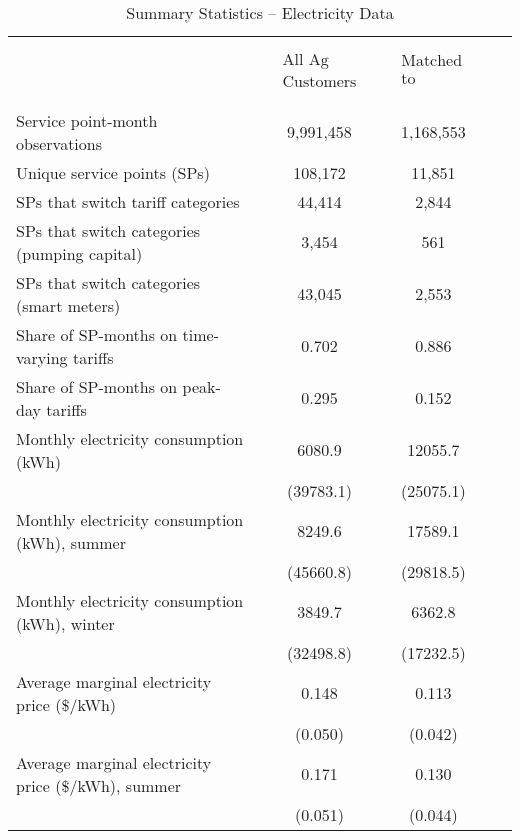 \begin{table}\centering
\caption{\normalsize Summary Statistics -- Electricity Data}
\label{tab:elec_summary_stats}
\begin{tabular}{lrcrcrr}
\hline
\hline
\\ 
\vspace{-8mm}
\\
&& $\begin{matrix}\text{All Ag}\\ \text{Customers}\end{matrix}$  && $\begin{matrix}\text{Matched} \\ \text{to Pumps}\end{matrix}$ \\
[.1em]
\cline{3-5}
\\
\vspace{-7mm}
\\
Service point-month observations && 9,991,458 && 1,168,553 \\ 
[.2em]
Unique service points (SPs) && 108,172 && 11,851 \\ 
[.2em]
SPs that switch tariff categories  && 44,414 && 2,844   \\
[.2em]
SPs that switch categories (pumping capital)  && 3,454 && 561   \\
[.2em]
SPs that switch categories (smart meters)  && 43,045 && 2,553   \\
[.2em]
Share of SP-months on time-varying tariffs  && 0.702 && 0.886   \\
[.2em]
Share of SP-months on peak-day tariffs  && 0.295 && 0.152   \\
[1.4em]
Monthly electricity consumption (kWh) && 6080.9 && 12055.7   \\
 && (39783.1) && (25075.1)   \\
[.4em]
Monthly electricity consumption (kWh), summer && 8249.6 && 17589.1   \\
 && (45660.8) && (29818.5)   \\
[.4em]
Monthly electricity consumption (kWh), winter && 3849.7 && 6362.8   \\
 && (32498.8) && (17232.5)   \\
[1.4em]
Average marginal electricity price (\$/kWh) && 0.148 && 0.113   \\
 && (0.050) && (0.042)   \\
[.4em]
Average marginal electricity price (\$/kWh), summer && 0.171 && 0.130   \\
 && (0.051) && (0.044)   \\

\end{tabular}
\end{table}
